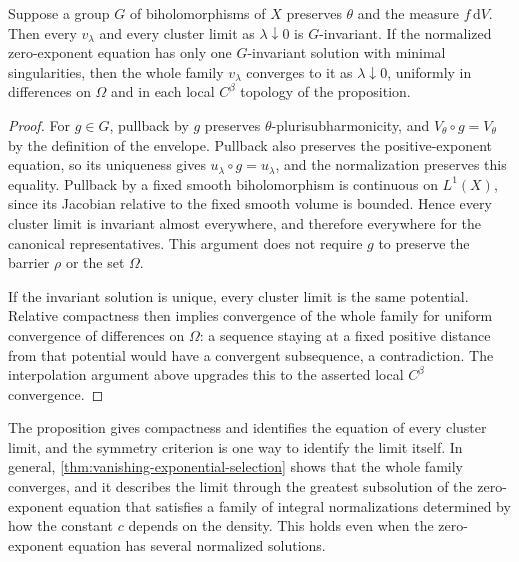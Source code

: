 \begin{corollary}\label{cor:big-exponential-symmetries}
Suppose a group $G$ of biholomorphisms of $X$ preserves $\theta$ and the measure $f\,\mathrm{d}V$. Then every $v_\lambda$ and every cluster limit as $\lambda\downarrow0$ is $G$-invariant. If the normalized zero-exponent equation has only one $G$-invariant solution with minimal singularities, then the whole family $v_\lambda$ converges to it as $\lambda\downarrow0$, uniformly in differences on $\Omega$ and in each local $C^\beta$ topology of the proposition.
\end{corollary}
\begin{proof}
For $g\in G$, pullback by $g$ preserves $\theta$-plurisubharmonicity, and $V_\theta\circ g=V_\theta$ by the definition of the envelope. Pullback also preserves the positive-exponent equation, so its uniqueness gives $u_\lambda\circ g=u_\lambda$, and the normalization preserves this equality. Pullback by a fixed smooth biholomorphism is continuous on $L^1(X)$, since its Jacobian relative to the fixed smooth volume is bounded. Hence every cluster limit is invariant almost everywhere, and therefore everywhere for the canonical representatives. This argument does not require $g$ to preserve the barrier $\rho$ or the set $\Omega$.

If the invariant solution is unique, every cluster limit is the same potential. Relative compactness then implies convergence of the whole family for uniform convergence of differences on $\Omega$: a sequence staying at a fixed positive distance from that potential would have a convergent subsequence, a contradiction. The interpolation argument above upgrades this to the asserted local $C^\beta$ convergence.
\end{proof}

The proposition gives compactness and identifies the equation of every cluster limit, and the symmetry criterion is one way to identify the limit itself. In general, \cref{thm:vanishing-exponential-selection} shows that the whole family converges, and it describes the limit through the greatest subsolution of the zero-exponent equation that satisfies a family of integral normalizations determined by how the constant $c$ depends on the density. This holds even when the zero-exponent equation has several normalized solutions.
